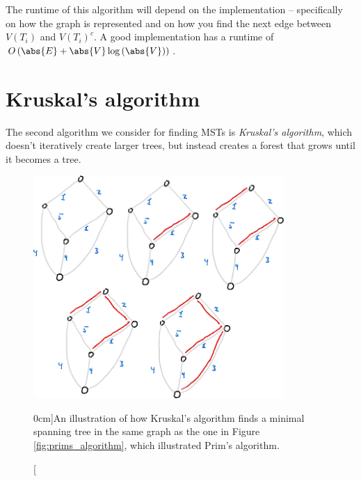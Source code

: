 \documentclass[nobib]{tufte-handout}
\begin{document}
\begin{remark}
  The runtime of this algorithm will depend on the implementation -- specifically on how the graph is represented and on how you find the next edge between $V(T_i)$ and $V(T_i)^c$. A good implementation has a runtime of $O\left(\abs{E} + \abs{V}\log\left(\abs{V}\right)\right)$.
\end{remark}

\section{Kruskal's algorithm}

The second algorithm we consider for finding MSTs is \emph{Kruskal's algorithm}, which doesn't iteratively create larger trees, but instead creates a forest that grows until it becomes a tree.

\begin{figure}
  \centering
  \includegraphics[width=0.85\textwidth]{graphics/L6_prim_kruskal_dijkstra/kruskals_algorithm.png}
  \caption[][0cm]{An illustration of how Kruskal's algorithm finds a minimal spanning tree in the same graph as the one in Figure \ref{fig:prims_algorithm}, which illustrated Prim's algorithm.}
  \label{fig:kruskals_algorithm}
\end{figure}
\end{document}
